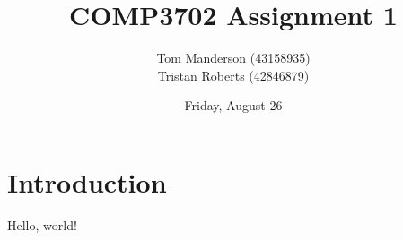 \documentclass[11pt,a4paper]{article}
\title{COMP3702 Assignment 1}
\author{
Tom Manderson (43158935)
\\
Tristan Roberts (42846879)
}
\date{Friday, August 26}
\begin{document}
\maketitle
\tableofcontents
\clearpage

\section{Introduction}
Hello, world!
\end{document}
